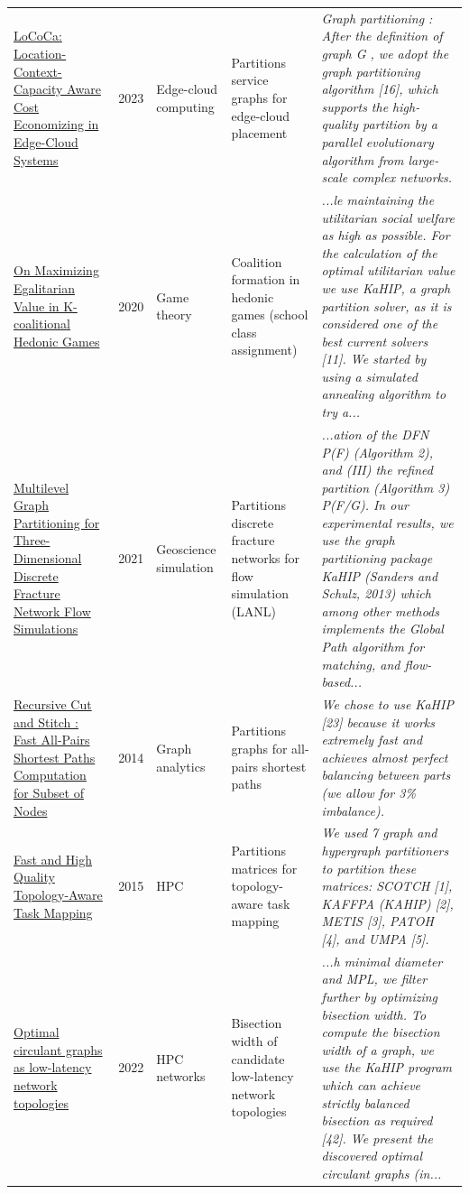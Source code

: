 \documentclass[9pt]{extarticle}
\begin{document}
\begin{longtable}{@{}>{\raggedright}p{6.6cm}r>{\raggedright}p{2.9cm}>{\raggedright}p{4.6cm}>{\raggedright\arraybackslash}p{8.4cm}@{}}
\href{https://doi.org/10.1109/GLOBECOM54140.2023.10436804}{LoCoCa: Location-Context-Capacity Aware Cost Economizing in Edge-Cloud Systems} & 2023 & Edge-cloud computing & Partitions service graphs for edge-cloud placement & {\footnotesize\itshape Graph partitioning : After the definition of graph G , we adopt the graph partitioning algorithm [16], which supports the high-quality partition by a parallel evolutionary algorithm from large-scale complex networks.}\\
\href{https://doi.org/10.48550/arxiv.2001.10772}{On Maximizing Egalitarian Value in K-coalitional Hedonic Games} & 2020 & Game theory & Coalition formation in hedonic games (school class assignment) & {\footnotesize\itshape ...le maintaining the utilitarian social welfare as high as possible. For the calculation of the optimal utilitarian value we use KaHIP, a graph partition solver, as it is considered one of the best current solvers [11]. We started by using a simulated annealing algorithm to try a...}\\
\href{https://doi.org/10.1007/s11004-021-09944-y}{Multilevel Graph Partitioning for Three-Dimensional Discrete Fracture Network Flow Simulations} & 2021 & Geoscience simulation & Partitions discrete fracture networks for flow simulation (LANL) & {\footnotesize\itshape ...ation of the DFN P(F) (Algorithm 2), and (III) the refined partition (Algorithm 3) P(F/G). In our experimental results, we use the graph partitioning package KaHIP (Sanders and Schulz, 2013) which among other methods implements the Global Path algorithm for matching, and flow-based...}\\
\href{https://www.semanticscholar.org/paper/397d5d8292180ff0357091253e6e0f6230602473}{Recursive Cut and Stitch : Fast All-Pairs Shortest Paths Computation for Subset of Nodes} & 2014 & Graph analytics & Partitions graphs for all-pairs shortest paths & {\footnotesize\itshape We chose to use KaHIP [23] because it works extremely fast and achieves almost perfect balancing between parts (we allow for 3\% imbalance).}\\
\href{https://doi.org/10.1109/IPDPS.2015.93}{Fast and High Quality Topology-Aware Task Mapping} & 2015 & HPC & Partitions matrices for topology-aware task mapping & {\footnotesize\itshape We used 7 graph and hypergraph partitioners to partition these matrices: SCOTCH [1], KAFFPA (KAHIP) [2], METIS [3], PATOH [4], and UMPA [5].}\\
\href{https://doi.org/10.1007/s11227-022-04396-5}{Optimal circulant graphs as low-latency network topologies} & 2022 & HPC networks & Bisection width of candidate low-latency network topologies & {\footnotesize\itshape ...h minimal diameter and MPL, we filter further by optimizing bisection width. To compute the bisection width of a graph, we use the KaHIP program which can achieve strictly balanced bisection as required [42]. We present the discovered optimal circulant graphs (in...}\\

\end{longtable}
\end{document}

